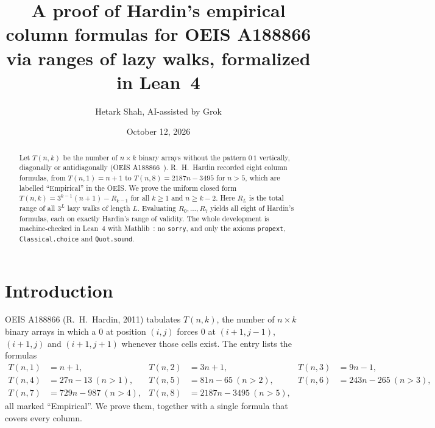 \documentclass[11pt]{article}
\author{Hetark Shah, AI-assisted by Grok}
\date{October 12, 2026}
\title{A proof of Hardin's empirical column formulas for OEIS A188866 via ranges of lazy walks, formalized in Lean~4}
\theoremstyle{remark}\newtheorem{remark}[theorem]{Remark}
\begin{document}
\maketitle

\begin{abstract}
Let $T(n,k)$ be the number of $n\times k$ binary arrays without the pattern $0\,1$ vertically, diagonally or antidiagonally (OEIS A188866~\cite{oeis}). R.~H.~Hardin recorded eight column formulas, from $T(n,1)=n+1$ to $T(n,8)=2187n-3495$ for $n>5$, which are labelled ``Empirical'' in the OEIS. We prove the uniform closed form $T(n,k)=3^{k-1}(n+1)-R_{k-1}$ for all $k\ge1$ and $n\ge k-2$. Here $R_L$ is the total range of all $3^L$ lazy walks of length $L$. Evaluating $R_0,\dots,R_7$ yields all eight of Hardin's formulas, each on exactly Hardin's range of validity. The whole development is machine-checked in Lean~4 with Mathlib~\cite{mathlib}: no \texttt{sorry}, and only the axioms \texttt{propext}, \texttt{Classical.choice} and \texttt{Quot.sound}.
\end{abstract}

\section{Introduction}
OEIS A188866 (R.~H.~Hardin, 2011) tabulates $T(n,k)$, the number of $n\times k$ binary arrays in which a $0$ at position $(i,j)$ forces $0$ at $(i+1,j-1)$, $(i+1,j)$ and $(i+1,j+1)$ whenever those cells exist. The entry lists the formulas
\begin{align*}
T(n,1)&=n+1, & T(n,2)&=3n+1, & T(n,3)&=9n-1,\\
T(n,4)&=27n-13\ (n>1), & T(n,5)&=81n-65\ (n>2), & T(n,6)&=243n-265\ (n>3),\\
T(n,7)&=729n-987\ (n>4), & T(n,8)&=2187n-3495\ (n>5),
\end{align*}
all marked ``Empirical''. We prove them, together with a single formula that covers every column.
\end{document}
